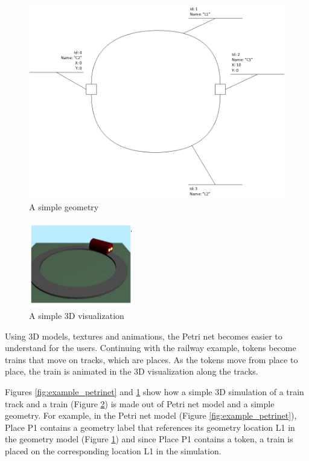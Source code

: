 \begin{figure}[htp]
	\begin{center}
		\includegraphics[width=\textwidth]{image/example_petrinet_geometry.png}
		\caption{A simple geometry}
		\label{fig:example_petrinet_geometry}
	\end{center}
\end{figure}


\begin{figure}[htp]
\begin{center}
  \includegraphics[width=0.4\textwidth]{image/3d.png}
  \caption{A simple 3D visualization}
  \label{fig:example_3d}
\end{center}
\end{figure}


Using 3D models, textures and animations, the Petri net becomes easier to understand for the users. Continuing with the railway example, tokens become trains that move on tracks, which are places. As the tokens move from place to place, the train is animated in the 3D visualization along the tracks.

Figures \ref{fig:example_petrinet} and \ref{fig:example_petrinet_geometry} show how a simple 3D simulation of a train track and a train (Figure \ref{fig:example_3d}) is made out of Petri net model and a simple geometry. For example, in the Petri net model (Figure \ref{fig:example_petrinet}), Place P1 contains a geometry label that references its geometry location L1 in the geometry model (Figure \ref{fig:example_petrinet_geometry}) and since Place P1 contains a token, a train is placed on the corresponding location L1 in the simulation. 

